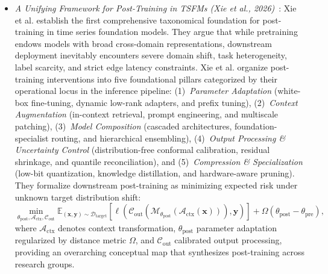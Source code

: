 \begin{itemize}[leftmargin=*]
    \item \emph{A Unifying Framework for Post-Training in TSFMs (Xie et al., 2026)}~\cite{xie2026posttraining}: Xie et al. establish the first comprehensive taxonomical foundation for post-training in time series foundation models. They argue that while pretraining endows models with broad cross-domain representations, downstream deployment inevitably encounters severe domain shift, task heterogeneity, label scarcity, and strict edge latency constraints. Xie et al. organize post-training interventions into five foundational pillars categorized by their operational locus in the inference pipeline: (1)~\emph{Parameter Adaptation} (white-box fine-tuning, dynamic low-rank adapters, and prefix tuning), (2)~\emph{Context Augmentation} (in-context retrieval, prompt engineering, and multiscale patching), (3)~\emph{Model Composition} (cascaded architectures, foundation-specialist routing, and hierarchical ensembling), (4)~\emph{Output Processing \& Uncertainty Control} (distribution-free conformal calibration, residual shrinkage, and quantile reconciliation), and (5)~\emph{Compression \& Specialization} (low-bit quantization, knowledge distillation, and hardware-aware pruning). They formalize downstream post-training as minimizing expected risk under unknown target distribution shift:
    \begin{equation}
        \min_{\theta_{\text{post}}, \mathcal{A}_{\text{ctx}}, \mathcal{C}_{\text{out}}} \mathbb{E}_{(\mathbf{x}, \mathbf{y}) \sim \mathcal{D}_{\text{target}}} \left[ \ell\left(\mathcal{C}_{\text{out}}\left(\mathcal{M}_{\theta_{\text{post}}}(\mathcal{A}_{\text{ctx}}(\mathbf{x}))\right), \mathbf{y}\right) \right] + \Omega(\theta_{\text{post}} - \theta_{\text{pre}}),
    \end{equation}
    where $\mathcal{A}_{\text{ctx}}$ denotes context transformation, $\theta_{\text{post}}$ parameter adaptation regularized by distance metric $\Omega$, and $\mathcal{C}_{\text{out}}$ calibrated output processing, providing an overarching conceptual map that synthesizes post-training across research groups.


\end{itemize}
